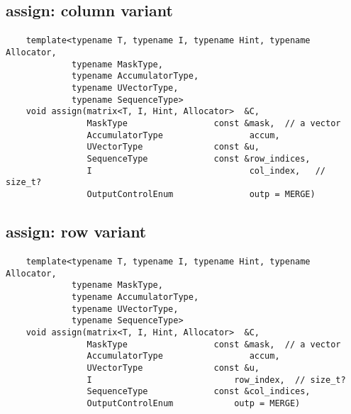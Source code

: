 \subsection{{\sf assign}: column variant}

\paragraph{\syntax}

\begin{verbatim}
    template<typename T, typename I, typename Hint, typename Allocator,
             typename MaskType,
             typename AccumulatorType,
             typename UVectorType,
             typename SequenceType>
    void assign(matrix<T, I, Hint, Allocator>  &C,
                MaskType                 const &mask,  // a vector
                AccumulatorType                 accum,
                UVectorType              const &u,
                SequenceType             const &row_indices,
                I                               col_index,   // size_t?
                OutputControlEnum               outp = MERGE)
\end{verbatim}


\subsection{{\sf assign}: row variant}

\paragraph{\syntax}

\begin{verbatim}
    template<typename T, typename I, typename Hint, typename Allocator,
             typename MaskType,
             typename AccumulatorType,
             typename UVectorType,
             typename SequenceType>
    void assign(matrix<T, I, Hint, Allocator>  &C,
                MaskType                 const &mask,  // a vector
                AccumulatorType                 accum,
                UVectorType              const &u,
                I                            row_index,  // size_t?
                SequenceType             const &col_indices,
                OutputControlEnum            outp = MERGE)
\end{verbatim}


